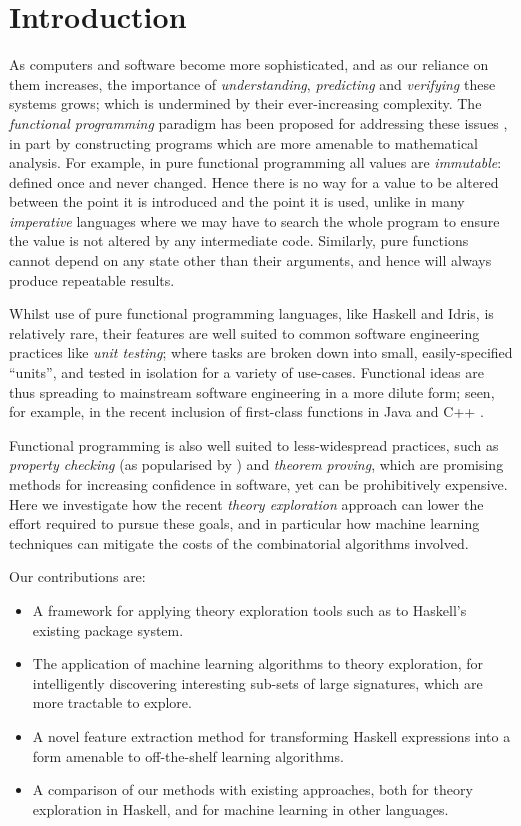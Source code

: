 \section{Introduction}

As computers and software become more sophisticated, and as our reliance on them increases, the importance of \emph{understanding}, \emph{predicting} and \emph{verifying} these systems grows; which is undermined by their ever-increasing complexity. The \emph{functional programming} paradigm has been proposed for addressing these issues \cite{hughes1989functional}, in part by constructing programs which are more amenable to mathematical analysis. For example, in pure functional programming all values are \emph{immutable}: defined once and never changed. Hence there is no way for a value to be altered between the point it is introduced and the point it is used, unlike in many \emph{imperative} languages where we may have to search the whole program to ensure the value is not altered by any intermediate code. Similarly, pure functions cannot depend on any state other than their arguments, and hence will always produce repeatable results.

Whilst use of pure functional programming languages, like Haskell and Idris, is relatively rare, their features are well suited to common software engineering practices like \emph{unit testing}; where tasks are broken down into small, easily-specified ``units'', and tested in isolation for a variety of use-cases. Functional ideas are thus spreading to mainstream software engineering in a more dilute form; seen, for example, in the recent inclusion of first-class functions in Java \cite{gosling2015java} and C++ \cite{willcock2006lambda}.

Functional programming is also well suited to less-widespread practices, such as \emph{property checking} (as popularised by \qcheck{}) and \emph{theorem proving}, which are promising methods for increasing confidence in software, yet can be prohibitively expensive. Here we investigate how the recent \emph{theory exploration} approach can lower the effort required to pursue these goals, and in particular how machine learning techniques can mitigate the costs of the combinatorial algorithms involved.

Our contributions are:

\begin{itemize}
  \item A framework for applying theory exploration tools such as \qspec{} to Haskell's existing package system.
  \item The application of machine learning algorithms to theory exploration, for intelligently discovering interesting sub-sets of large signatures, which are more tractable to explore.
  \item A novel feature extraction method for transforming Haskell expressions into a form amenable to off-the-shelf learning algorithms.
  \item A comparison of our methods with existing approaches, both for theory exploration in Haskell, and for machine learning in other languages.
\end{itemize}

